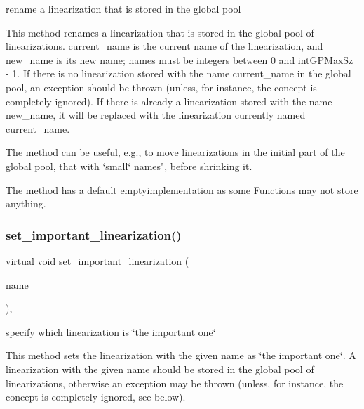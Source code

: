 rename a linearization that is stored in the global pool 

This method renames a linearization that is stored in the global pool of linearizations. current\+\_\+name is the current name of the linearization, and new\+\_\+name is its new name; names must be integers between 0 and int\+G\+P\+Max\+Sz -\/ 1. If there is no linearization stored with the name current\+\_\+name in the global pool, an exception should be thrown (unless, for instance, the concept is completely ignored). If there is already a linearization stored with the name new\+\_\+name, it will be replaced with the linearization currently named current\+\_\+name.

The method can be useful, e.\+g., to move linearizations in the initial part of the global pool, that with \char`\"{}small\char`\"{} names", before shrinking it.

The method has a default emptyimplementation as some Functions may not store anything. \mbox{\label{class_s_m_spp__di__unipi__it_1_1_c05_function_a8f18fc84fa93ad03235186bda78238e4}} 
\subsubsection{\texorpdfstring{set\+\_\+important\+\_\+linearization()}{set\_important\_linearization()}}
{\footnotesize\ttfamily virtual void set\+\_\+important\+\_\+linearization (\begin{DoxyParamCaption}\item[{\mbox{\hyperlink{class_s_m_spp__di__unipi__it_1_1_c05_function_ae90bf93c6d4b4ada66791c735d1c03cc}{Linearization\+Name}}}]{name }\end{DoxyParamCaption})\hspace{0.3cm}{\ttfamily [inline]}, {\ttfamily [virtual]}}



specify which linearization is \char`\"{}the important one\char`\"{} 

This method sets the linearization with the given name as \char`\"{}the important
one\char`\"{}. A linearization with the given name should be stored in the global pool of linearizations, otherwise an exception may be thrown (unless, for instance, the concept is completely ignored, see below).

